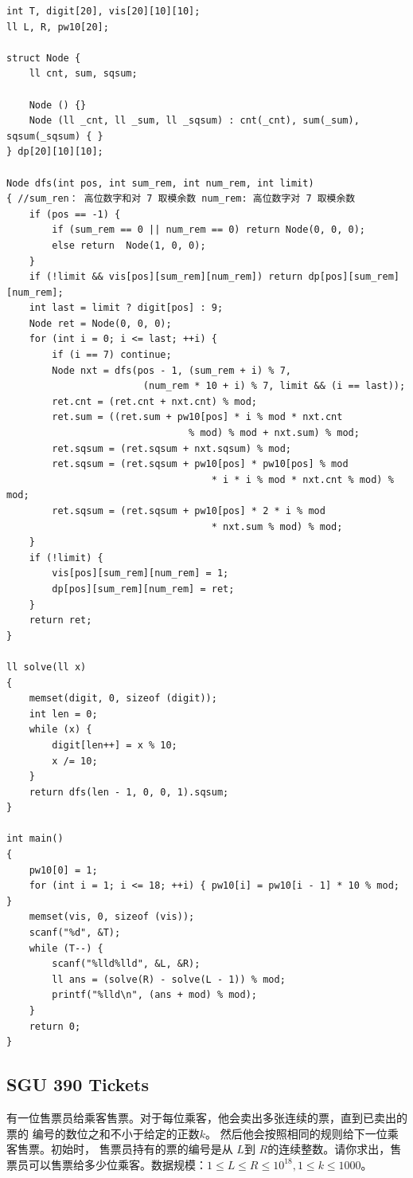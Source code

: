 \begin{lstlisting}
int T, digit[20], vis[20][10][10];
ll L, R, pw10[20];

struct Node {
	ll cnt, sum, sqsum;

	Node () {}
	Node (ll _cnt, ll _sum, ll _sqsum) : cnt(_cnt), sum(_sum), sqsum(_sqsum) { }
} dp[20][10][10];

Node dfs(int pos, int sum_rem, int num_rem, int limit)
{ //sum_ren： 高位数字和对 7 取模余数 num_rem: 高位数字对 7 取模余数
	if (pos == -1) {
		if (sum_rem == 0 || num_rem == 0) return Node(0, 0, 0);
		else return  Node(1, 0, 0);
	}
	if (!limit && vis[pos][sum_rem][num_rem]) return dp[pos][sum_rem][num_rem];
	int last = limit ? digit[pos] : 9;
	Node ret = Node(0, 0, 0);
	for (int i = 0; i <= last; ++i) {
		if (i == 7) continue;
		Node nxt = dfs(pos - 1, (sum_rem + i) % 7,
                        (num_rem * 10 + i) % 7, limit && (i == last));
		ret.cnt = (ret.cnt + nxt.cnt) % mod;
		ret.sum = ((ret.sum + pw10[pos] * i % mod * nxt.cnt
                                % mod) % mod + nxt.sum) % mod;
		ret.sqsum = (ret.sqsum + nxt.sqsum) % mod;
		ret.sqsum = (ret.sqsum + pw10[pos] * pw10[pos] % mod
                                    * i * i % mod * nxt.cnt % mod) % mod;
		ret.sqsum = (ret.sqsum + pw10[pos] * 2 * i % mod
                                    * nxt.sum % mod) % mod;
	}
	if (!limit) {
		vis[pos][sum_rem][num_rem] = 1;
		dp[pos][sum_rem][num_rem] = ret;
	}
	return ret;
}

ll solve(ll x)
{
	memset(digit, 0, sizeof (digit));
	int len = 0;
	while (x) {
		digit[len++] = x % 10;
		x /= 10;
	}
	return dfs(len - 1, 0, 0, 1).sqsum;
}

int main()
{
	pw10[0] = 1;
	for (int i = 1; i <= 18; ++i) { pw10[i] = pw10[i - 1] * 10 % mod; }
	memset(vis, 0, sizeof (vis));
	scanf("%d", &T);
	while (T--) {
		scanf("%lld%lld", &L, &R);
		ll ans = (solve(R) - solve(L - 1)) % mod;
		printf("%lld\n", (ans + mod) % mod);
	}
	return 0;
}
\end{lstlisting}

\subsection{SGU 390 Tickets}

有一位售票员给乘客售票。对于每位乘客，他会卖出多张连续的票，直到已卖出的票的 编号的数位之和不小于给定的正数$k$。 然后他会按照相同的规则给下一位乘客售票。初始时， 售票员持有的票的编号是从 $L$到 $R$的连续整数。请你求出，售票员可以售票给多少位乘客。数据规模：$1 \leq L \leq R \leq 10^{18}, 1 \leq k \leq 1000$。 \\

